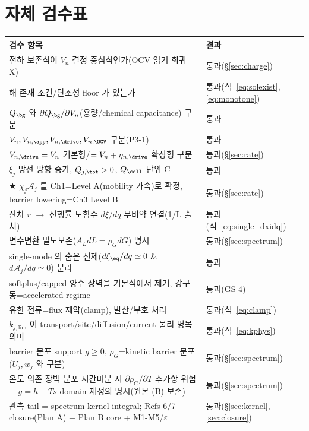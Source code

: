 \section{자체 검수표}\label{sec:selfcheck}
\begin{longtable}{p{} p{}}
\toprule 검수 항목 & 결과 \\ \midrule \endhead
전하 보존식이 $V_n$ 결정 중심식인가(OCV 읽기 회귀 X) & 통과(\S\ref{sec:charge}) \\
해 존재 조건/단조성 floor 가 있는가 & 통과(식~\eqref{eq:solexist},\eqref{eq:monotone}) \\
$Q_\bg$ 와 $\partial Q_\bg/\partial V_n$(용량/chemical capacitance) 구분 & 통과 \\
$V_n,V_{n,\app},V_{n,\drive},V_{n,\OCV}$ 구분(P3-1) & 통과 \\
$V_{n,\drive}=V_n$ 기본형/$=V_n+\eta_{n,\drive}$ 확장형 구분 & 통과(\S\ref{sec:rate}) \\
$\xi_j$ 방전 방향 증가, $Q_{j,\tot}>0$, $Q_\cell$ 단위 C & 통과 \\
★ $\chi_j\mathcal A_j$ 를 Ch1=Level A(mobility 가속)로 확정, barrier lowering=Ch3 Level B & 통과(\S\ref{sec:rate}) \\
잔차 $r$ $\to$ 진행률 도함수 $d\xi/dq$ 무비약 연결(1/L 출처) & 통과(식~\eqref{eq:single_dxidq}) \\
변수변환 밀도보존($A_L dL=\rho_G dG$) 명시 & 통과(\S\ref{sec:spectrum}) \\
single-mode 의 숨은 전제($d\xi_\eq/dq\simeq0$ \& $d\mathcal A_j/dq\simeq0$) 분리 & 통과 \\
softplus/capped 양수 장벽을 기본식에서 제거, 강구동=accelerated regime & 통과(GS-4) \\
유한 전류=flux 제약(clamp), 발산/부호 처리 & 통과(식~\eqref{eq:clamp}) \\
$k_{j,\mathrm{lim}}$ 이 transport/site/diffusion/current 물리 병목 의미 & 통과(식~\eqref{eq:kphys}) \\
barrier 분포 support $g\ge0$, $\rho_G$=kinetic barrier 분포($U_j,w_j$ 와 구분) & 통과(\S\ref{sec:spectrum}) \\
온도 의존 장벽 분포 시간미분 시 $\partial\rho_G/\partial T$ 추가항 위험 + $g=h-Ts$ domain 재정의 명시(원본 (B) 보존) & 통과(\S\ref{sec:spectrum}) \\
관측 tail = spectrum kernel integral; Refs 6/7 closure(Plan A) + Plan B core + M1-M5/$\varepsilon$ & 통과(\S\ref{sec:kernel},\ref{sec:closure}) \\

\end{longtable}
